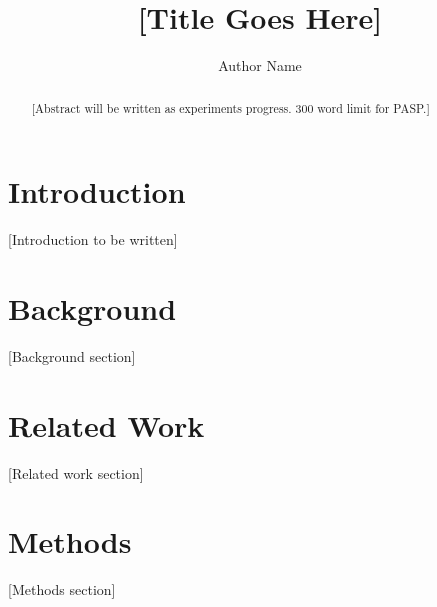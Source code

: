 \documentclass[linenumbers]{aastex701}
\begin{document}
\title{[Title Goes Here]}

\author{Author Name}

\begin{abstract}

[Abstract will be written as experiments progress. 300 word limit for PASP.]

\end{abstract}


\section{Introduction} \label{sec:intro}

[Introduction to be written]

\section{Background} \label{sec:background}

[Background section]

\section{Related Work} \label{sec:related}

[Related work section]

\section{Methods} \label{sec:methods}

[Methods section]

\end{document}
